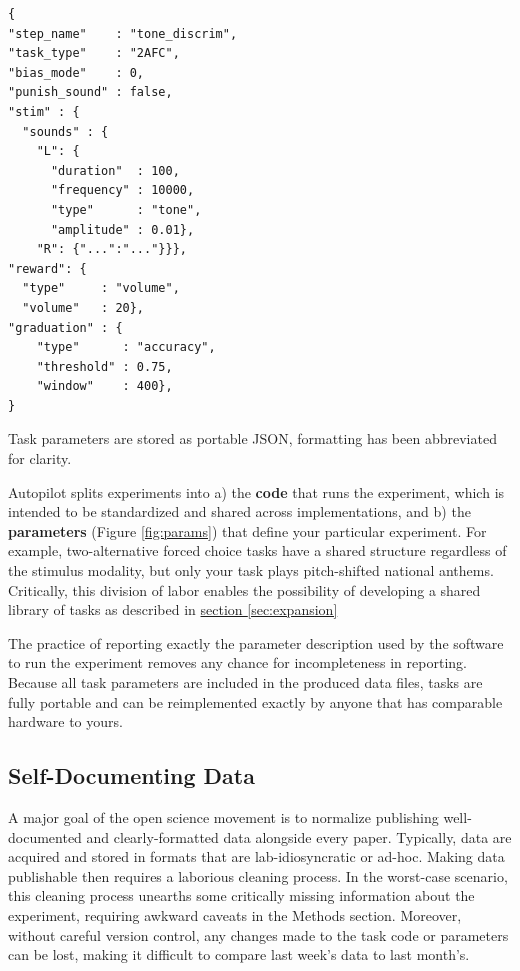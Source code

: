 %
\begin{marginfigure}[1.1cm]
\begin{verbatim}
{
"step_name"    : "tone_discrim",
"task_type"    : "2AFC",
"bias_mode"    : 0,
"punish_sound" : false,
"stim" : {
  "sounds" : {
    "L": {
      "duration"  : 100,
      "frequency" : 10000,
      "type"      : "tone",
      "amplitude" : 0.01},
    "R": {"...":"..."}}},
"reward": {
  "type"     : "volume",
  "volume"   : 20},
"graduation" : {
    "type"      : "accuracy",
    "threshold" : 0.75,
    "window"    : 400},
}
\end{verbatim}
\caption{Task parameters are stored as portable JSON, formatting has been abbreviated for clarity.}
\label{fig:params}
\end{marginfigure}%
%
%
Autopilot splits experiments into a) the \textbf{code} that runs the experiment, which is intended to be standardized and shared across implementations, and b) the \textbf{parameters} (Figure \ref{fig:params}) that define your particular experiment. For example, two-alternative forced choice tasks have a shared structure regardless of the stimulus modality, but only your task plays pitch-shifted national anthems. Critically, this division of labor enables the possibility of developing a shared library of tasks as described in \hyperref[sec:expansion]{section \ref{sec:expansion}}%

The practice of reporting exactly the parameter description used by the software to run the experiment removes any chance for incompleteness in reporting. Because all task parameters are included in the produced data files, tasks are fully portable and can be reimplemented exactly by anyone that has comparable hardware to yours. 

\subsection{Self-Documenting Data}
\label{sec:data}

A major goal of the open science movement is to normalize publishing well-documented and clearly-formatted data alongside every paper. Typically, data are acquired and stored in formats that are lab-idiosyncratic or ad-hoc. Making data publishable then requires a laborious cleaning process. In the worst-case scenario, this cleaning process unearths some critically missing information about the experiment, requiring awkward caveats in the Methods section. Moreover, without careful version control, any changes made to the task code or parameters can be lost, making it difficult to compare last week's data to last month's.


